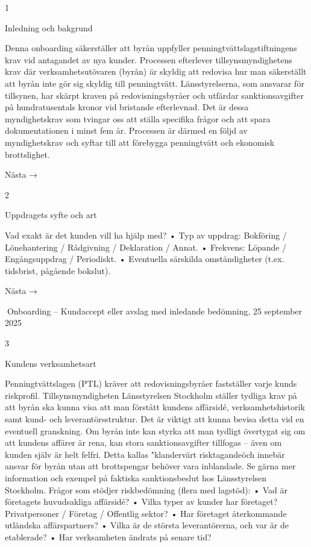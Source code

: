 1

Inledning och bakgrund

Denna onboarding säkerställer att byrån uppfyller penningtvättslagstiftningens krav vid
antagandet av nya kunder. Processen efterlever tillsynsmyndighetens krav där verksamhetsutövaren (byrån) är skyldig att redovisa hur man säkerställt att byrån inte gör sig
skyldig till penningtvätt.
Länsstyrelserna, som ansvarar för tillsynen, har skärpt kraven på redovisningsbyråer och utfärdar sanktionsavgifter på hundratusentals kronor vid bristande efterlevnad.
Det är dessa myndighetskrav som tvingar oss att ställa specifika frågor och att spara
dokumentationen i minst fem år.
Processen är därmed en följd av myndighetskrav och syftar till att förebygga penningtvätt och ekonomisk brottslighet.

Nästa →

2

Uppdragets syfte och art

Vad exakt är det kunden vill ha hjälp med?
• Typ av uppdrag: Bokföring / Lönehantering / Rådgivning / Deklaration / Annat.
• Frekvens: Löpande / Engångsuppdrag / Periodiskt.
• Eventuella särskilda omständigheter (t.ex. tidsbrist, pågående bokslut).

Nästa →

Onboarding – Kundaccept eller avslag med inledande bedömning,
25 september 2025

3

Kundens verksamhetsart

Penningtvättslagen (PTL) kräver att redovisningsbyråer fastställer varje kunds riskprofil.
Tillsynsmyndigheten Länsstyrelsen Stockholm ställer tydliga krav på att byrån ska kunna
visa att man förstått kundens affärsidé, verksamhetshistorik samt kund- och leverantörsstruktur.
Det är viktigt att kunna bevisa detta vid en eventuell granskning. Om byrån inte
kan styrka att man tydligt övertygat sig om att kundens affärer är rena, kan stora sanktionsavgifter tillfogas – även om kunden själv är helt felfri. Detta kallas "klandervärt
risktagandeöch innebär ansvar för byrån utan att brottspengar behöver vara inblandade.
Se gärna mer information och exempel på faktiska sanktionsbeslut hos Länsstyrelsen
Stockholm.
Frågor som stödjer riskbedömning (flera med lagstöd):
• Vad är företagets huvudsakliga affärsidé?
• Vilka typer av kunder har företaget? Privatpersoner / Företag / Offentlig sektor?
• Har företaget återkommande utländska affärspartners?
• Vilka är de största leverantörerna, och var är de etablerade?
• Har verksamheten ändrats på senare tid?

